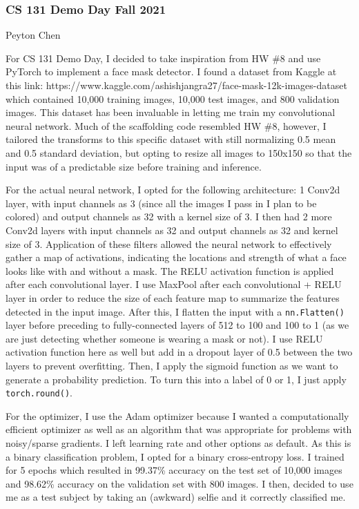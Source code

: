 
\hypertarget{cs-131-demo-day-fall-2021}{%
\subsubsection{CS 131 Demo Day Fall
2021}\label{cs-131-demo-day-fall-2021}}

Peyton Chen

For CS 131 Demo Day, I decided to take inspiration from HW \#8 and use
PyTorch to implement a face mask detector. I found a dataset from Kaggle
at this link:
https://www.kaggle.com/ashishjangra27/face-mask-12k-images-dataset which
contained 10,000 training images, 10,000 test images, and 800 validation
images. This dataset has been invaluable in letting me train my
convolutional neural network. Much of the scaffolding code resembled HW
\#8, however, I tailored the transforms to this specific dataset with
still normalizing 0.5 mean and 0.5 standard deviation, but opting to
resize all images to 150x150 so that the input was of a predictable size
before training and inference.

For the actual neural network, I opted for the following architecture: 1
Conv2d layer, with input channels as 3 (since all the images I pass in I
plan to be colored) and output channels as 32 with a kernel size of 3. I
then had 2 more Conv2d layers with input channels as 32 and output
channels as 32 and kernel size of 3. Application of these filters
allowed the neural network to effectively gather a map of activations,
indicating the locations and strength of what a face looks like with and
without a mask. The RELU activation function is applied after each
convolutional layer. I use MaxPool after each convolutional + RELU layer
in order to reduce the size of each feature map to summarize the
features detected in the input image. After this, I flatten the input
with a \texttt{nn.Flatten()} layer before preceding to fully-connected
layers of 512 to 100 and 100 to 1 (as we are just detecting whether
someone is wearing a mask or not). I use RELU activation function here
as well but add in a dropout layer of 0.5 between the two layers to
prevent overfitting. Then, I apply the sigmoid function as we want to
generate a probability prediction. To turn this into a label of 0 or 1,
I just apply \texttt{torch.round()}.

For the optimizer, I use the Adam optimizer because I wanted a
computationally efficient optimizer as well as an algorithm that was
appropriate for problems with noisy/sparse gradients. I left learning
rate and other options as default. As this is a binary classification
problem, I opted for a binary cross-entropy loss. I trained for 5 epochs
which resulted in 99.37\% accuracy on the test set of 10,000 images and
98.62\% accuracy on the validation set with 800 images. I then, decided
to use me as a test subject by taking an (awkward) selfie and it
correctly classified me.

